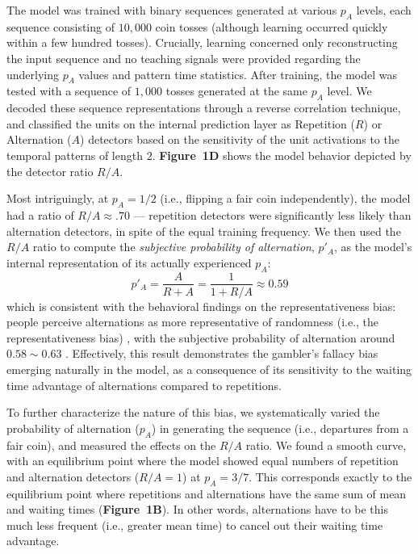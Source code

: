 \documentclass[11pt]{article}
\begin{document}
The model was trained with binary sequences generated at various $p_A$ levels,
each sequence consisting of $10,\!000$ coin tosses (although learning occurred quickly within a few hundred tosses).
Crucially, learning concerned only reconstructing the input sequence and no teaching signals were provided regarding the underlying $p_A$ values and pattern time statistics.
After training, the model was tested with a sequence of $1,\!000$ tosses generated at the same $p_A$ level.
We decoded these sequence representations through a reverse correlation technique, and classified the units on the internal prediction layer as Repetition ($R$) or Alternation ($A$) detectors based on the sensitivity of the unit activations to the temporal patterns of length $2$. \textbf{Figure~1D} shows the model behavior depicted by the detector ratio $R/A$.

Most intriguingly, at $p_A=1/2$ (i.e., flipping a fair coin independently), the model had a ratio of $R/A \approx .70$ --- repetition detectors were significantly less likely than alternation detectors, in spite of the equal training frequency.
We then used the $R/A$ ratio to compute the \emph{subjective probability of alternation}, $p'_A$, as the model's internal representation of its actually experienced $p_A$:
\begin{equation}\label{eq:subjective-pa}
  p'_A = \frac{A}{R+A} = \frac{1}{1+ R/A} \approx 0.59
\end{equation}
which is consistent with the behavioral findings on the representativeness bias: people perceive alternations as more representative of randomness (i.e., the representativeness bias) \cite{Tversky1974}, with the subjective probability of alternation around $0.58\sim0.63$ \cite{Falk1997}.
Effectively, this result demonstrates the gambler's fallacy bias emerging naturally in the model, as a consequence of its sensitivity to the waiting time advantage of alternations compared to repetitions.

To further characterize the nature of this bias, we systematically varied the probability of alternation ($p_A$) in generating the sequence (i.e., departures from a fair coin), and measured the effects on the $R/A$ ratio. We found a smooth curve, with an equilibrium point where the model showed equal numbers of repetition and alternation detectors ($R/A = 1$) at $p_A = 3/7$.
This corresponds exactly to the equilibrium point where repetitions and alternations have the same sum of mean and waiting times (\textbf{Figure~1B}).
In other words, alternations have to be this much less frequent (i.e., greater mean time) to cancel out their waiting time advantage.
\end{document}
